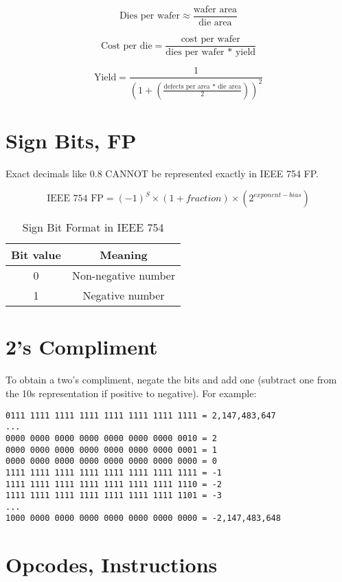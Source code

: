 \documentclass{article}
\begin{document}
\[ \textrm{Dies per wafer} \approx \frac{\textrm{wafer area}}{\textrm{die area}} \]

\[ \textrm{Cost per die} = \frac{\textrm{cost per wafer}}{\textrm{dies per wafer * yield}}\]

\[ \textrm{Yield} = \frac{1}{\left(1+ \left( \frac{\textrm{defects per area * die area}}{2}\right) \right)^2} \]

\section{Sign Bits, FP}

Exact decimals like 0.8 CANNOT be represented exactly in IEEE 754 FP.

\[ \textrm{IEEE 754 FP} = (-1)^S \times (1 + fraction) \times (2^{exponent - bias}) \]

\begin{table}[ht]
\caption{Sign Bit Format in IEEE 754} 
\centering 
\begin{tabular}{| c | c |} 
\hline 
  Bit value & Meaning \\ [0.5ex] 
\hline
0 & Non-negative number \\
1 & Negative number \\
\hline
\end{tabular}
\label{table:nonlin} 
\end{table}

\section{2's Compliment}

To obtain a two's compliment, negate the bits and add one (subtract one from the 10s representation if positive to negative). For example:

\begin{verbatim}
0111 1111 1111 1111 1111 1111 1111 1111 = 2,147,483,647
...
0000 0000 0000 0000 0000 0000 0000 0010 = 2
0000 0000 0000 0000 0000 0000 0000 0001 = 1
0000 0000 0000 0000 0000 0000 0000 0000 = 0
1111 1111 1111 1111 1111 1111 1111 1111 = -1
1111 1111 1111 1111 1111 1111 1111 1110 = -2
1111 1111 1111 1111 1111 1111 1111 1101 = -3
...
1000 0000 0000 0000 0000 0000 0000 0000 = -2,147,483,648
\end{verbatim}

\section{Opcodes, Instructions}
\end{document}
